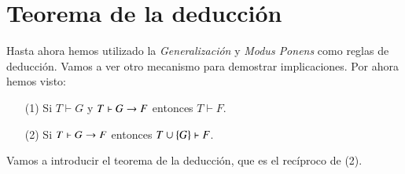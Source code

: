 \section{Teorema de la deducci\'on}

Hasta ahora hemos utilizado la \textit{Generalización} y \textit{Modus Ponens} como reglas de deducción. Vamos a ver otro mecanismo para demostrar implicaciones.
Por ahora hemos visto:
\begin{itemize}
    \item[(1)] Si $T \vdash G$ y $T \vdash G \rightarrow F$ entonces $T \vdash F$.
    \item[(2)] Si $T \vdash G \rightarrow F$ entonces $T \cup \left\{G\right\} \vdash F$.
\end{itemize}
Vamos a introducir el teorema de la deducción, que es el recíproco de (2).

